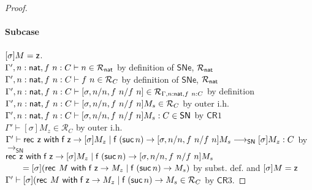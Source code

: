 \documentclass{article}
\newcommand{\SN}{\mathsf{SN}}
\newcommand{\SNe}{\mathsf{SNe}}
\newcommand{\CR}{\textsf{CR}}
\newcommand{\denot}[1]{\mathcal{R}_{#1}}
\newcommand{\inden}[3]{#1 \vdash #2 \in \denot{#3}}
\newcommand{\redSN}{\longrightarrow_\SN}
\begin{document}
\begin{proof}
 \paragraph{Subcase } $[\sigma]M = \mathsf{z}$.
 \\
 $\inden{\Gamma', n \hastype \nat, f~n \hastype C}{n}{\nat}$ \hfill by definition of $\SNe$, $\denot{\nat}$ \\
 $\inden{\Gamma', n \hastype \nat, f~n \hastype C}{f~n}{C}$ \hfill by definition of $\SNe$, $\denot{\nat}$ \\
 $\inden{\Gamma', n \hastype \nat, f~n \hastype C}{[\sigma, n/n, f~n/f~n]}{\Gamma, n:\nat, f~n:C}$ \hfill by definition \\
 $\inden{\Gamma', n \hastype \nat, f~n \hastype C}{[\sigma, n/n, f~n/f~n]M_s}{C}$ \hfill by outer i.h. \\
 $\Gamma', n \hastype \nat, f~n \hastype C \vdash [\sigma, n/n, f~n/f~n]M_s : C \in \SN$ \hfill by $\CR1$ \\
 $\inden{\Gamma'}{[\sigma]M_z}{C}$ \hfill by outer i.h. \\
 $\Gamma' \vdash \recnat \zero {[\sigma]M_z} {[\sigma, n/n,f~n/f~n]M_s} \redSN [\sigma]M_z : C$
 \hfill by $\redSN$ \\
 $\mathsf{rec}^{}~\mathsf{z}~\mathsf{with}\;{\mathsf{f}}\;\mathsf{z} \rightarrow [\sigma]M_z \mid {\mathsf{f}}\;({\mathsf{suc}}\, n) \rightarrow {[\sigma, n/n,f~n/f~n]M_s}$ \\
 $\qquad = [\sigma](\mathsf{rec}^{}~M~\mathsf{with}\;{\mathsf{f}}\;\mathsf{z} \rightarrow M_z \mid {\mathsf{f}}\;({\mathsf{suc}}\, n) \rightarrow {M_s})$ \hfill by subst. def. and $[\sigma]M = \mathsf{z}$\\
 $\inden{\Gamma'}{[\sigma](\recnat{M} {M_z}{M_s}}{C}$ \hfill by $\CR3$.


\end{proof}
\end{document}

